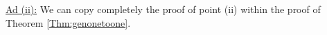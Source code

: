 \documentclass[12pt]{amsart}
\theoremstyle{plain}
\theoremstyle{remark}
\theoremstyle{definition}
\begin{document}
\underline{Ad (ii):} We can copy completely the proof of point (ii) within the proof of Theorem \ref{Thm:genonetoone}.
\epf





%
%
%

\medskip
\end{document}
